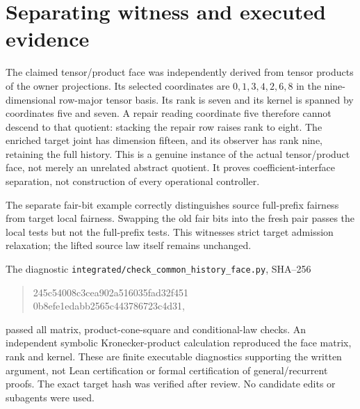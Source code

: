 \documentclass{article}
\begin{document}
\section*{Separating witness and executed evidence}
The claimed tensor/product face was independently derived from tensor products of the owner projections. Its selected coordinates are $0,1,3,4,2,6,8$ in the nine-dimensional row-major tensor basis. Its rank is seven and its kernel is spanned by coordinates five and seven. A repair reading coordinate five therefore cannot descend to that quotient: stacking the repair row raises rank to eight. The enriched target joint has dimension fifteen, and its observer has rank nine, retaining the full history. This is a genuine instance of the actual tensor/product face, not merely an unrelated abstract quotient. It proves coefficient-interface separation, not construction of every operational controller.

The separate fair-bit example correctly distinguishes source full-prefix fairness from target local fairness. Swapping the old fair bits into the fresh pair passes the local tests but not the full-prefix tests. This witnesses strict target admission relaxation; the lifted source law itself remains unchanged.

The diagnostic \texttt{integrated/check\_common\_history\_face.py}, SHA--256
\begin{quote}\ttfamily\small
245c54008c3cea902a516035fad32f451\\0b8efe1edabb2565c443786723c4d31,
\end{quote}
passed all matrix, product-cone-square and conditional-law checks. An independent symbolic Kronecker-product calculation reproduced the face matrix, rank and kernel. These are finite executable diagnostics supporting the written argument, not Lean certification or formal certification of general/recurrent proofs. The exact target hash was verified after review. No candidate edits or subagents were used.
\end{document}
